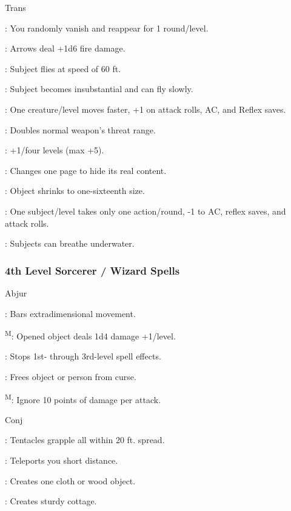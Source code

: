 Trans

: You randomly vanish and reappear for 1 round/level.

: Arrows deal +1d6 fire damage.

: Subject flies at speed of 60 ft.

: Subject becomes insubstantial and can fly slowly.

: One creature/level moves faster, +1 on attack rolls, AC, and Reflex saves.

: Doubles normal weapon's threat range.

: +1/four levels (max +5).

: Changes one page to hide its real content.

: Object shrinks to one-sixteenth size.

: One subject/level takes only one action/round, -1 to AC, reflex saves, and attack rolls.

: Subjects can breathe underwater.

\subsubsection{4th Level Sorcerer / Wizard Spells}

Abjur

: Bars extradimensional movement.

\textsuperscript{M}: Opened object deals 1d4 damage +1/level.

: Stops 1st- through 3rd-level spell effects.

: Frees object or person from curse.

\textsuperscript{M}: Ignore 10 points of damage per attack.

Conj

: Tentacles grapple all within 20 ft. spread.

: Teleports you short distance.

: Creates one cloth or wood object.

: Creates sturdy cottage.

